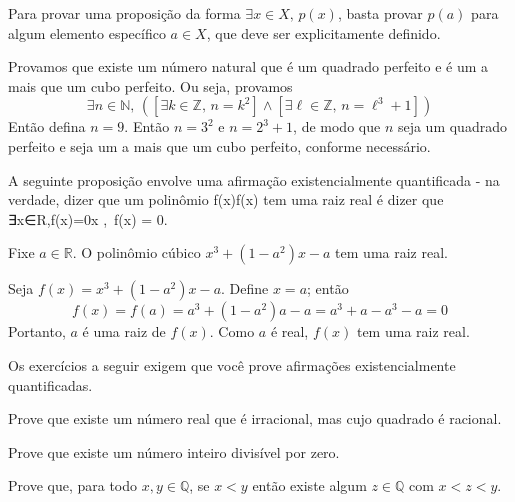 \begin{strategy}
\label{strProvingExistential}
Para provar uma proposição da forma $\exists x \in X,\, p(x)$, basta provar $p(a)$ para algum elemento específico $a \in X$, que deve ser explicitamente definido.
\end{strategy}

\begin{example}
Provamos que existe um número natural que é um quadrado perfeito e é um a mais que um cubo perfeito. Ou seja, provamos
\[\exists n \in \mathbb{N},\, ([\exists k \in \mathbb{Z},\, n=k^2] \wedge [\exists \ell \in \mathbb{Z} ,\, n=\ell^3 + 1])\]
Então defina $n=9$. Então $n=3^2$ e $n=2^3+1$, de modo que $n$ seja um quadrado perfeito e seja um a mais que um cubo perfeito, conforme necessário.
\end{example}

A seguinte proposição envolve uma afirmação existencialmente quantificada - na verdade, dizer que um polinômio f(x)f(x) tem uma raiz real é dizer que ∃x∈R,f(x)=0\exists x \in {},\, f(x) = 0.

\begin{proposition}
Fixe $a \in \mathbb{R}$. O polinômio cúbico $x^3 + (1-a^2)x - a$ tem uma raiz real.
\end{proposition}
\begin{cproof}
Seja $f(x)=x^3+(1-a^2)x-a$. Define $x=a$; então
\[f(x) = f(a) = a^3 + (1-a^2)a - a = a^3 + a - a^3 - a = 0\]
Portanto, $a$ é uma raiz de $f(x)$. Como $a$ é real, $f(x)$ tem uma raiz real.
\end{cproof}

Os exercícios a seguir exigem que você prove afirmações existencialmente quantificadas.

\begin{exercise}
Prove que existe um número real que é irracional, mas cujo quadrado é racional.\end
{exercise}

\begin{exercise}
Prove que existe um número inteiro divisível por zero.
\end{exercise}

\begin{example}
Prove que, para todo $x,y \in \mathbb{Q}$, se $x < y$ então existe algum $z \in \mathbb{Q}$ com $x<z<y$.
\end{example}

